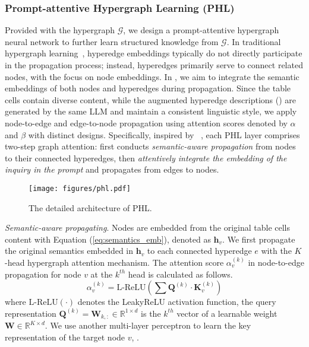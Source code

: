 {\subsubsection{Prompt-attentive Hypergraph Learning (PHL)}\label{sec:PHL}
Provided with the hypergraph $\mathcal{G}$, we design a prompt-attentive hypergraph neural network to further learn structured knowledge from $\mathcal{G}$. %
In traditional hypergraph learning~\cite{hypergcn,hgnn,hnhn,hcha}, hyperedge embeddings typically do not directly participate in the propagation process; instead, hyperedges primarily serve to connect related nodes, with the focus on node embeddings. In \name, we aim to integrate the semantic embeddings of both nodes and hyperedges during propagation. Since the table cells contain diverse content, while the augmented hyperedge descriptions () are generated by the same LLM and maintain a consistent linguistic style, we apply node-to-edge and edge-to-node propagation using attention scores denoted by $\alpha$ and $\beta$ with distinct designs. Specifically, inspired by ~\cite{allset}, each PHL layer comprises two-step graph attention: first conducts \textit{semantic-aware propagation} from nodes to their connected hyperedges, then \textit{attentively integrate the embedding of the inquiry in the prompt} and propagates from edges to nodes. 

\begin{figure}[tbp]
    \centering
    \texttt{[image: figures/phl.pdf]}
    \caption{The detailed architecture of PHL.}
    \label{fig:phl}
\end{figure}

\textit{Semantic-aware propagating}. Nodes are embedded from the original table cells content with Equation (\ref{eq:semantics_emb}), denoted as $\mathbf{h}_v$. We first propagate the original semantics embedded in $\mathbf{h}_v$ to each connected hyperedge $e$ with the $K$-head hypergraph attention mechanism. The attention score $\alpha_v^{(k)}$ in node-to-edge propagation for node $v$ at the $k^{th}$ head is calculated as follows. 
\begin{equation}
\alpha^{(k)}_v=\text{L-ReLU}(\sum\mathbf{Q}^{(k)}\cdot \mathbf{K}^{(k)}_v)
\label{eq:att_alpha}
\end{equation}
where $\text{L-ReLU}(\cdot)$ denotes the LeakyReLU activation function, the query representation $\mathbf{Q}^{(k)}=\mathbf{W}_{k,:}\in\mathbb{R}^{1\times d}$ is the $k^{th}$ vector of a learnable weight $\mathbf{W}\in\mathbb{R}^{K\times d}$. We use another multi-layer perceptron to learn the key representation of the target node $v$, . 

}
